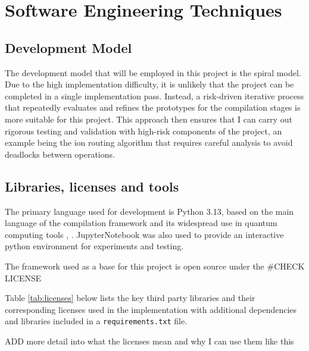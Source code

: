 \section{Software Engineering Techniques}

\subsection{Development Model}

The development model that will be employed in this project is the spiral model. Due to the high implementation difficulty, it is unlikely that the project can be completed in a single implementation pass. Instead, a risk-driven iterative process that repeatedly evaluates and refines the prototypes for the compilation stages is more suitable for this project. This approach then ensures that I can carry out rigorous testing and validation with high-risk components of the project, an example being the ion routing algorithm that requires careful analysis to avoid deadlocks between operations. 

\subsection{Libraries, licenses and tools}

The primary language used for development is Python 3.13, based on the main language of the compilation framework \cite{scottPaper} and its widespread use in quantum computing tools \cite{chromobius}, \cite{stim}. JupyterNotebook was also used to provide an interactive python environment for experiments and testing. 

The framework used as a base for this project is open source under the \#CHECK LICENSE

Table \ref{tab:licenses} below lists the key third party libraries and their corresponding licenses used in the implementation with additional dependencies and libraries included in a \texttt{requirements.txt} file. 

ADD more detail into what the licenses mean and why I can use them like this

